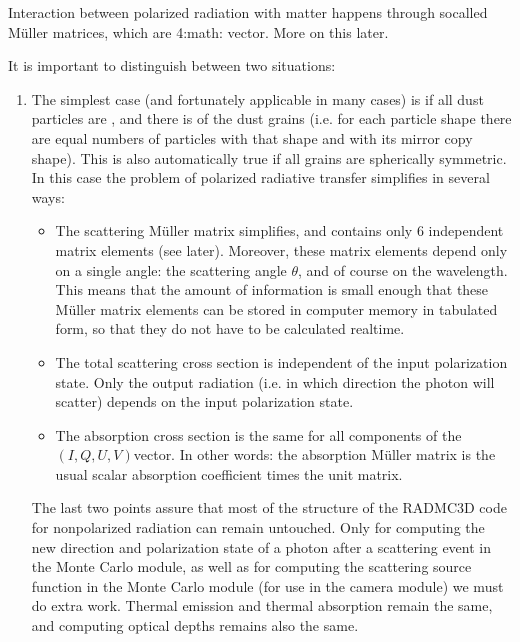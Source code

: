 \documentclass[letterpaper,10pt,english]{sphinxmanual}
\begin{document}
Interaction between polarized radiation with matter happens through so\sphinxhyphen{}called
Müller matrices, which are 4:math: vector. More on this later.

It is important to distinguish between two situations:
\begin{enumerate}
%
\item {} 
The simplest case (and fortunately applicable in many cases) is if all
dust particles are , and there is  of the dust grains (i.e. for each particle shape
there are equal numbers of particles with that shape and with its mirror
copy shape). This is also automatically true if all grains are spherically
symmetric. In this case the problem of polarized radiative transfer
simplifies in several ways:
\begin{itemize}
\item {} 
The scattering Müller matrix simplifies, and contains only 6
independent matrix elements (see later). Moreover, these matrix elements
depend only on a single angle: the scattering angle \(\theta\), and of
course on the wavelength. This means that the amount of information is
small enough that these Müller matrix elements can be stored in
computer memory in tabulated form, so that they do not have to be
calculated real\sphinxhyphen{}time.

\item {} 
The total scattering cross section is independent of the input
polarization state. Only the output radiation (i.e. in which
direction the photon will scatter) depends on the input polarization
state.

\item {} 
The absorption cross section is the same for all components of
the \((I,Q,U,V)\)\sphinxhyphen{}vector. In other words: the absorption Müller
matrix is the usual scalar absorption coefficient times the unit
matrix.

\end{itemize}

The last two points assure that most of the structure of the RADMC\sphinxhyphen{}3D code
for non\sphinxhyphen{}polarized radiation can remain untouched. Only for computing the
new direction and polarization state of a photon after a scattering event
in the Monte Carlo module, as well as for computing the scattering source
function in the Monte Carlo module (for use in the camera module) we must
do extra work. Thermal emission and thermal absorption remain the same,
and computing optical depths remains also the same.


\end{enumerate}
\end{document}
